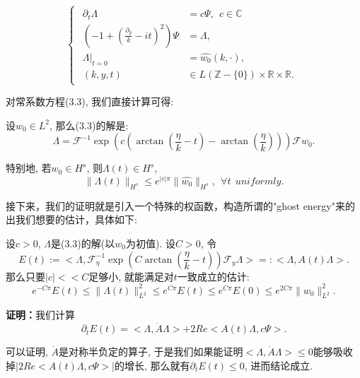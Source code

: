 \begin{equation}
\begin{cases}
\begin{aligned}
\partial_t \Lambda&=c\Psi,~~c\in \mathbb{C}\\
(-1+(\frac{\partial_y}{k}-it)^2)\Psi&=\Lambda, \\
\Lambda|_{t=0}&=\hat{w_0}(k,\cdot), \\
(k,y,t)&\in L(\mathbb{Z}-\{0\})\times\mathbb{R}\times\mathbb{R}.
\end{aligned}
\end{cases}
\end{equation}

对常系数方程(3.3), 我们直接计算可得:

\begin{thm} \songti\rm 设$w_0\in L^2$, 那么(3.3)的解是:
\begin{equation}
\Lambda=\mathcal{F}^{-1}\exp(c(\arctan(\frac{\eta}{k}-t)-\arctan(\frac{\eta}{k})))\mathcal{F}w_0.
\end{equation}

特别地, 若$w_0\in H^s$, 则$\Lambda(t)\in H^s$, $$\|\Lambda(t)\|_{H^s}\leq e^{|c|\pi}\|\hat{w_0}\|_{H^s},~~\forall t~~uniformly.$$
\end{thm}

接下来，我们的证明就是引入一个特殊的权函数，构造所谓的"ghost energy"来的出我们想要的估计，具体如下:

\begin{thm}
\songti\rm 设$c>0$, $\Lambda$是(3.3)的解(以$w_0$为初值). 设$C>0$, 令
\begin{equation}
E(t):=<\Lambda,\mathcal{F}_{\eta}^{-1}\exp(C\arctan(\frac{\eta}{k}-t))\mathcal{F}_y\Lambda>=:<\Lambda,A(t)\Lambda>. 
\end{equation}
那么只要$|c|<<C$足够小, 就能满足对$t$一致成立的估计:
\begin{equation}
e^{-C\pi}E(t)\leq\|\Lambda(t)\|_{L^2}^2\leq e^{C\pi}E(t)\leq e^{C\pi}E(0)\leq e^{2C\pi}\|w_0\|_{L^2}^2.
\end{equation}
\end{thm}

\textbf{证明：}我们计算
\begin{equation}
\partial_t E(t)=<\Lambda,\dot{A}\Lambda>+2Re<A(t)\Lambda, c\Psi>.
\end{equation}

可以证明, $\dot{A}$是对称半负定的算子, 于是我们如果能证明$<\Lambda, \dot{A}\Lambda>\leq 0$能够吸收掉$|2Re<A(t)\Lambda, c\Psi>|$的增长, 那么就有$\partial_t E(t)\leq 0$, 进而结论成立.

